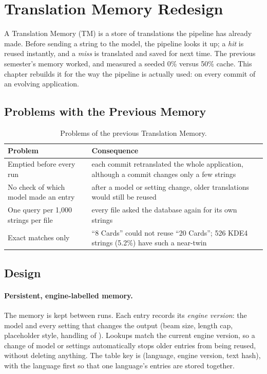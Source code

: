 \section{Translation Memory Redesign}
\label{sec:tmdesign}

A Translation Memory (TM) is a store of translations the pipeline has already made. Before sending a string to the model,
the pipeline looks it up; a \emph{hit} is reused instantly, and a \emph{miss} is translated and saved for next time. The
previous semester's memory worked, and measured a seeded 0\% versus 50\% cache. This chapter rebuilds it for the way the
pipeline is actually used: on every commit of an evolving application.

\subsection{Problems with the Previous Memory}
\begin{table}[H]
\centering
\caption[Problems of the previous memory]{Problems of the previous Translation Memory.}
\label{tab:tmflaws}
\begin{tabularx}{\linewidth}{@{}l L@{}}
\toprule
\textbf{Problem} & \textbf{Consequence} \\
\midrule
Emptied before every run & each commit retranslated the whole application, although a commit changes only a few strings \\
No check of which model made an entry & after a model or setting change, older translations would still be reused \\
One query per 1,000 strings per file & every file asked the database again for its own strings \\
Exact matches only & ``8 Cards'' could not reuse ``20 Cards''; 526 KDE4 strings (5.2\%) have such a near-twin \\
\bottomrule
\end{tabularx}
\end{table}

\subsection{Design}
\paragraph{Persistent, engine-labelled memory.} The memory is kept between runs. Each entry records its \emph{engine
version}: the model and every setting that changes the output (beam size, length cap, placeholder style, handling of
). Lookups match the current engine version, so a change of model or settings automatically stops older entries
from being reused, without deleting anything. The table key is (language, engine version, text hash), with the language
first so that one language's entries are stored together.

